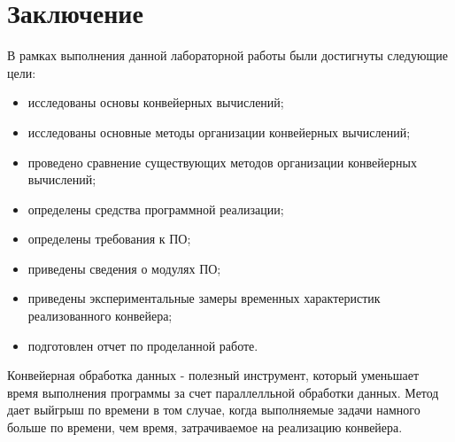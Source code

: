 \chapter*{Заключение}

В рамках выполнения данной лабораторной работы были достигнуты следующие цели:
\begin{itemize}
	\item исследованы основы конвейерных вычислений;
	\item исследованы основные методы организации конвейерных вычислений;
	\item проведено сравнение существующих методов организации конвейерных вычислений;
	\item определены средства программной реализации;
	\item определены требования к ПО;
	\item приведены сведения о модулях ПО;
	\item приведены экспериментальные замеры временных характеристик реализованного конвейера;
    \item подготовлен отчет по проделанной работе.
\end{itemize}

Конвейерная обработка данных - полезный инструмент, который уменьшает время выполнения программы за счет параллелльной обработки данных. Метод дает выйгрыш по времени в том случае, когда выполняемые задачи намного больше по времени, чем время, затрачиваемое на реализацию конвейера.